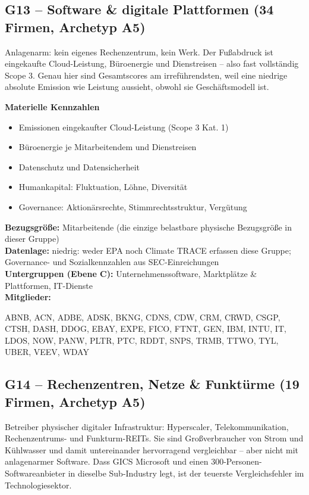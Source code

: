 \medskip
\subsection*{G13 -- Software \& digitale Plattformen \normalfont\small (34 Firmen, Archetyp A5)}
\noindent Anlagenarm: kein eigenes Rechenzentrum, kein Werk. Der Fußabdruck ist eingekaufte Cloud-Leistung, Büroenergie und Dienstreisen -- also fast vollständig Scope 3. Genau hier sind Gesamtscores am irreführendsten, weil eine niedrige absolute Emission wie Leistung aussieht, obwohl sie Geschäftsmodell ist.

\noindent\textbf{Materielle Kennzahlen}
\begin{itemize}[nosep,leftmargin=1.2em]
  \item Emissionen eingekaufter Cloud-Leistung (Scope 3 Kat. 1)
  \item Büroenergie je Mitarbeitendem und Dienstreisen
  \item Datenschutz und Datensicherheit
  \item Humankapital: Fluktuation, Löhne, Diversität
  \item Governance: Aktionärsrechte, Stimmrechtsstruktur, Vergütung
\end{itemize}
\noindent\textbf{Bezugsgröße:} Mitarbeitende (die einzige belastbare physische Bezugsgröße in dieser Gruppe)\\
\textbf{Datenlage:} niedrig: weder EPA noch Climate TRACE erfassen diese Gruppe; Governance- und Sozialkennzahlen aus SEC-Einreichungen\\
\textbf{Untergruppen (Ebene C):} Unternehmenssoftware, Marktplätze \& Plattformen, IT-Dienste\\
\textbf{Mitglieder:} {\raggedright\small\ttfamily ABNB, ACN, ADBE, ADSK, BKNG, CDNS, CDW, CRM, CRWD, CSGP, CTSH, DASH, DDOG, EBAY, EXPE, FICO, FTNT, GEN, IBM, INTU, IT, LDOS, NOW, PANW, PLTR, PTC, RDDT, SNPS, TRMB, TTWO, TYL, UBER, VEEV, WDAY\par}

\medskip
\subsection*{G14 -- Rechenzentren, Netze \& Funktürme \normalfont\small (19 Firmen, Archetyp A5)}
\noindent Betreiber physischer digitaler Infrastruktur: Hyperscaler, Telekommunikation, Rechenzentrums- und Funkturm-REITs. Sie sind Großverbraucher von Strom und Kühlwasser und damit untereinander hervorragend vergleichbar -- aber nicht mit anlagenarmer Software. Dass GICS Microsoft und einen 300-Personen-Softwareanbieter in dieselbe Sub-Industry legt, ist der teuerste Vergleichsfehler im Technologiesektor.

